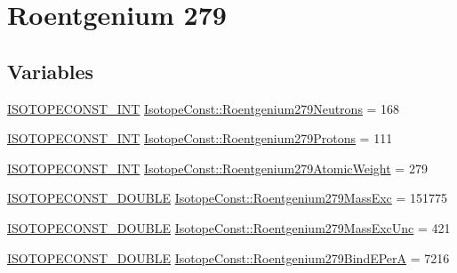 \hypertarget{group___isotope_const-_roentgenium-_rg279}{}\section{Roentgenium 279}
\label{group___isotope_const-_roentgenium-_rg279}
\subsection*{Variables}
\begin{DoxyCompactItemize}
\item 
\mbox{\hyperlink{group___isotope_const-_macros_ga5f18360b3e99483a35c32d789e62621c}{I\+S\+O\+T\+O\+P\+E\+C\+O\+N\+S\+T\+\_\+\+I\+NT}} \mbox{\hyperlink{group___isotope_const-_roentgenium-_rg279_ga5a6f053a16e6e5560848416631af70b6}{Isotope\+Const\+::\+Roentgenium279\+Neutrons}} = 168
\item 
\mbox{\hyperlink{group___isotope_const-_macros_ga5f18360b3e99483a35c32d789e62621c}{I\+S\+O\+T\+O\+P\+E\+C\+O\+N\+S\+T\+\_\+\+I\+NT}} \mbox{\hyperlink{group___isotope_const-_roentgenium-_rg279_gaf07c59fbece0183abcf67344f6b9e619}{Isotope\+Const\+::\+Roentgenium279\+Protons}} = 111
\item 
\mbox{\hyperlink{group___isotope_const-_macros_ga5f18360b3e99483a35c32d789e62621c}{I\+S\+O\+T\+O\+P\+E\+C\+O\+N\+S\+T\+\_\+\+I\+NT}} \mbox{\hyperlink{group___isotope_const-_roentgenium-_rg279_ga0297aa761f97148fc9cfd2983582f1a2}{Isotope\+Const\+::\+Roentgenium279\+Atomic\+Weight}} = 279
\item 
\mbox{\hyperlink{group___isotope_const-_macros_ga8f45a7272ce02c0b4c65c44636ed719a}{I\+S\+O\+T\+O\+P\+E\+C\+O\+N\+S\+T\+\_\+\+D\+O\+U\+B\+LE}} \mbox{\hyperlink{group___isotope_const-_roentgenium-_rg279_gadf9d5041893c18410be68b56fbc27855}{Isotope\+Const\+::\+Roentgenium279\+Mass\+Exc}} = 151775
\item 
\mbox{\hyperlink{group___isotope_const-_macros_ga8f45a7272ce02c0b4c65c44636ed719a}{I\+S\+O\+T\+O\+P\+E\+C\+O\+N\+S\+T\+\_\+\+D\+O\+U\+B\+LE}} \mbox{\hyperlink{group___isotope_const-_roentgenium-_rg279_ga7acc9202185d922483a6a576d5187379}{Isotope\+Const\+::\+Roentgenium279\+Mass\+Exc\+Unc}} = 421
\item 
\mbox{\hyperlink{group___isotope_const-_macros_ga8f45a7272ce02c0b4c65c44636ed719a}{I\+S\+O\+T\+O\+P\+E\+C\+O\+N\+S\+T\+\_\+\+D\+O\+U\+B\+LE}} \mbox{\hyperlink{group___isotope_const-_roentgenium-_rg279_ga617fefe69b8696e69a1ae52e81d9afb1}{Isotope\+Const\+::\+Roentgenium279\+Bind\+E\+PerA}} = 7216

\end{DoxyCompactItemize}
